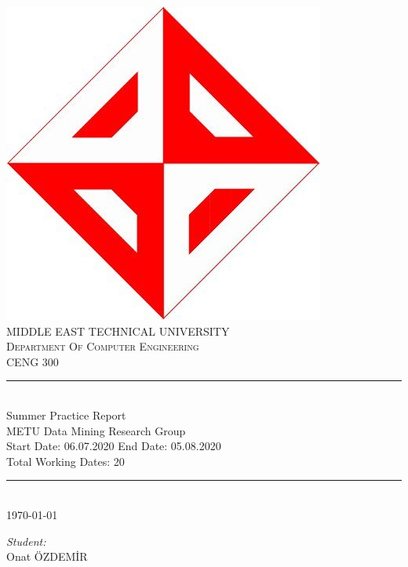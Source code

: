 \documentclass[12pt]{article}
\begin{document}
	\begin{titlepage}
		\newcommand{\HRule}{\rule{\linewidth}{0.1mm}} 
		\center 
		\includegraphics[scale=0.12]{ceng} \\
		\vspace{1cm}
		\textsc{\Large MIDDLE EAST TECHNICAL UNIVERSITY}\\[0.5cm]
		\textsc{\large Department Of Computer Engineering}\\[0.5cm]
		\textsc{\large CENG 300}\\
		\HRule \\[0.4cm]
		{ \huge \Large Summer Practice Report }\\[0.4cm]
		METU Data Mining Research Group \\
		Start Date: 06.07.2020\hspace{25px}  End Date: 05.08.2020\\
		Total Working Dates: 20
		
		\HRule \\[0.3cm]
		{\today}\\[1.2cm]
		
		
		\begin{minipage}{0.4\textwidth}
			\begin{flushleft} \large
				
				\emph{Student:}\\
				Onat ÖZDEMİR
			\end{flushleft}
			

\end{minipage}
\end{titlepage}
\end{document}
